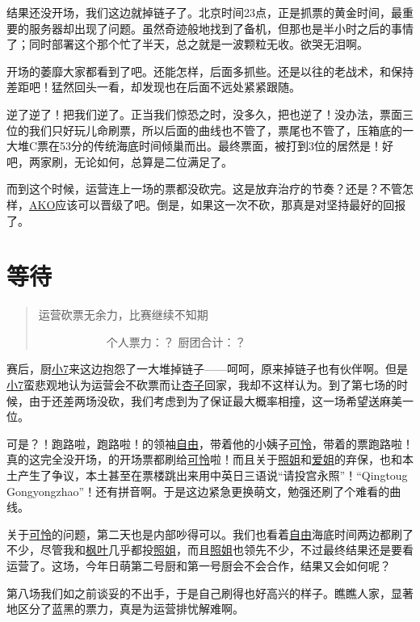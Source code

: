 结果还没开场，我们这边就掉链子了。北京时间23点，正是抓票的黄金时间，最重要的服务器却出现了问题。虽然奇迹般地找到了备机，但那也是半小时之后的事情了；同时部署这个那个忙了半天，总之就是一波颗粒无收。欲哭无泪啊。

开场的萎靡大家都看到了吧。还能怎样，后面多抓些。还是以往的老战术，和保持差距吧！猛然回头一看，却发现也在后面不远处紧紧跟随。

逆了逆了！把我们逆了。正当我们惊恐之时，没多久，把也逆了！没办法，票面三位的我们只好玩儿命刷票，所以后面的曲线也不管了，票尾也不管了，压箱底的一大堆C票在53分的传统海底时间倾巢而出。最终票面，被打到3位的居然是！好吧，两家刷，无论如何，总算是二位满足了。

而到这个时候，运营连上一场的票都没砍完。这是放弃治疗的节奏？还是？不管怎样，\uline{AKO}应该可以晋级了吧。倒是，如果这一次不砍，那真是对坚持最好的回报了。

\chapter{等待}
\begin{quote}
运营砍票无余力，比赛继续不知期

　　　　　　个人票力：？ 厨团合计：？
\end{quote}

赛后，厨\uline{小7}来这边抱怨了一大堆掉链子——呵呵，原来掉链子也有伙伴啊。但是\uline{小7}蛮悲观地认为运营会不砍票而让\uline{杏子}回家，我却不这样认为。到了第七场的时候，由于还差两场没砍，我们考虑到为了保证最大概率相撞，这一场希望送麻美一位。

可是？！跑路啦，跑路啦！的领袖\uline{自由}，带着他的小姨子\uline{可怜}，带着的票跑路啦！真的这完全没开场，的开场票都刷给\uline{可怜}啦！而且关于\uline{照姐}和\uline{爱姐}的弃保，也和本土产生了争议，本土甚至在票楼跳出来用中英日三语说“请投宫永照”！“Qingtoug Gongyongzhao”！还有拼音啊。于是这边紧急更换萌文，勉强还刷了个难看的曲线。

关于\uline{可怜}的问题，第二天也是内部吵得可以。我们也看着\uline{自由}海底时间两边都刷了不少，尽管我和\uline{枫叶}几乎都投\uline{照姐}，而且\uline{照姐}也领先不少，不过最终结果还是要看运营了。这场，今年日萌第二号厨和第一号厨会不会合作，结果又会如何呢？

第八场我们如之前谈妥的不出手，于是自己刷得也好高兴的样子。瞧瞧人家，显著地区分了蓝黑的票力，真是为运营排忧解难啊。

